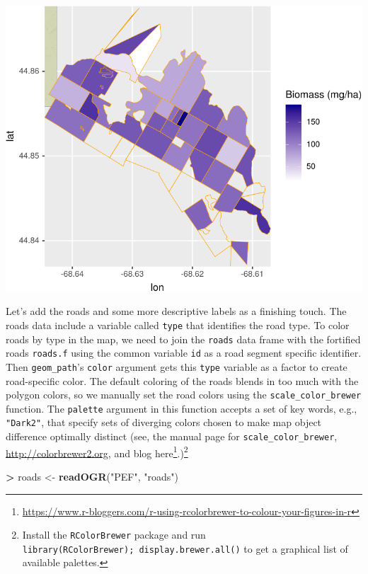 \documentclass[]{krantz}
\makeatletter
\newenvironment{Shaded}{\begin{snugshade}}{\end{snugshade}}
\newcommand{\KeywordTok}[1]{\textcolor[rgb]{0.27,0.27,0.27}{\textbf{#1}}}
\newcommand{\NormalTok}[1]{#1}
\newcommand{\OperatorTok}[1]{\textcolor[rgb]{0.43,0.43,0.43}{\textbf{#1}}}
\newcommand{\StringTok}[1]{\textcolor[rgb]{0.5,0.5,0.5}{#1}}
\renewcommand{\href}[2]{#2\footnote{\url{#1}}}
\newenvironment{kframe}{%
\medskip{}
\setlength{\fboxsep}{.8em}
 \def\at@end@of@kframe{}%
 \ifinner\ifhmode%
  \def\at@end@of@kframe{\end{minipage}}%
  \begin{minipage}{\columnwidth}%
 \fi\fi%
 \def\FrameCommand##1{\hskip\@totalleftmargin \hskip-\fboxsep
 \colorbox{shadecolor}{##1}\hskip-\fboxsep
     \hskip-\linewidth \hskip-\@totalleftmargin \hskip\columnwidth}%
 \MakeFramed {\advance\hsize-\width
   \@totalleftmargin\z@ \linewidth\hsize
   \@setminipage}}%
 {\par\unskip\endMakeFramed%
 \at@end@of@kframe}
\renewenvironment{Shaded}{\begin{kframe}}{\end{kframe}}
\makeatother
\begin{document}
\includegraphics{bookdown_files/figure-latex/unnamed-chunk-194-1.pdf}

Let's add the roads and some more descriptive labels as a finishing touch. The roads data include a variable called \texttt{type} that identifies the road type. To color roads by type in the map, we need to join the \texttt{roads} data frame with the fortified roads \texttt{roads.f} using the common variable \texttt{id} as a road segment specific identifier. Then \texttt{geom\_path}'s \texttt{color} argument gets this \texttt{type} variable as a factor to create road-specific color. The default coloring of the roads blends in too much with the polygon colors, so we manually set the road colors using the \texttt{scale\_color\_brewer} function. The \texttt{palette} argument in this function accepts a set of key words, e.g., \texttt{"Dark2"}, that specify sets of diverging colors chosen to make map object difference optimally distinct (see, the manual page for \texttt{scale\_color\_brewer}, \url{http://colorbrewer2.org}, and blog \href{https://www.r-bloggers.com/r-using-rcolorbrewer-to-colour-your-figures-in-r}{here}.)\footnote{Install the \texttt{RColorBrewer} package and run \texttt{library(RColorBrewer);\ display.brewer.all()} to get a graphical list of available palettes.}

\begin{Shaded}
\begin{Highlighting}[]
\OperatorTok{>}\StringTok{ }\NormalTok{roads <-}\StringTok{ }\KeywordTok{readOGR}\NormalTok{(}\StringTok{"PEF"}\NormalTok{, }\StringTok{"roads"}\NormalTok{)}
\end{Highlighting}
\end{Shaded}
\end{document}
